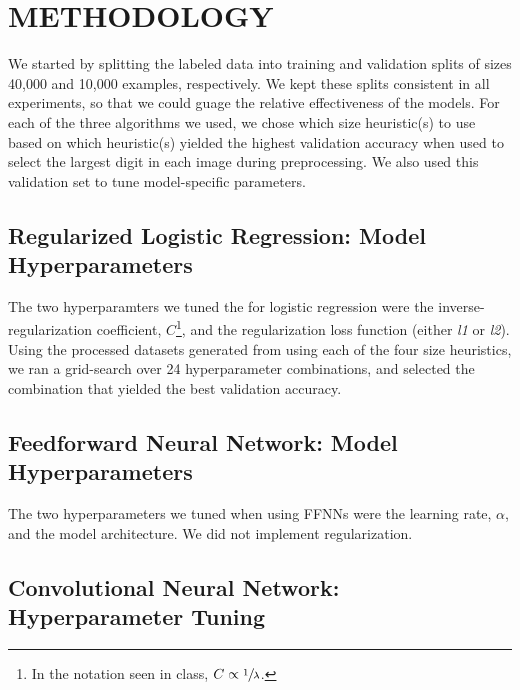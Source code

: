 \documentclass[letterpaper, 10 pt, conference]{ieeeconf}  %
\begin{document}
\section{METHODOLOGY}

We started by splitting the labeled data into training and validation splits of sizes 40,000 and 10,000 examples, respectively. We kept these splits consistent in all experiments, so that we could guage the relative effectiveness of the models. For each of the three algorithms we used, we chose which size heuristic(s) to use based on which heuristic(s) yielded the highest validation accuracy when used to select the largest digit in each image during preprocessing. We also used this validation set to tune model-specific parameters.

\subsection{Regularized Logistic Regression: Model Hyperparameters} 

The two hyperparamters we tuned the for logistic regression were the inverse-regularization coefficient, $C$\footnote{In the notation seen in class, $C \propto \sfrac{1}{\lambda}$.}, and the regularization loss function (either \emph{l1} or \emph{l2}). Using the processed datasets generated from using each of the four size heuristics, we ran a grid-search over 24 hyperparameter combinations, and selected the combination that yielded the best validation accuracy.   

\subsection{Feedforward Neural Network: Model Hyperparameters} 

The two hyperparameters we tuned when using FFNNs were the learning rate, $\alpha$, and the model architecture. We did not implement regularization.

\subsection{Convolutional Neural Network: Hyperparameter Tuning} 
\end{document}
